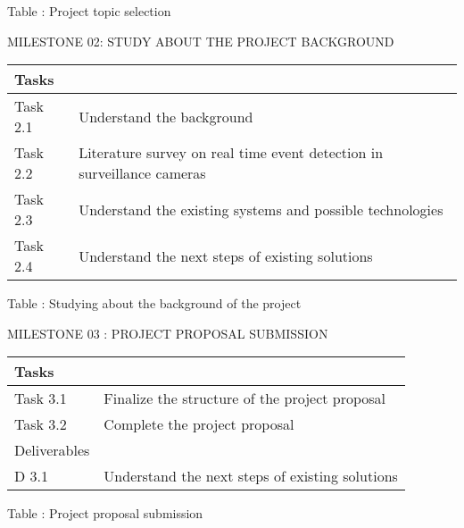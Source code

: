 \documentclass[
]{article}
\begin{document}
Table : Project topic selection

MILESTONE 02: STUDY ABOUT THE PROJECT BACKGROUND

\begin{longtable}[]{@{}ll@{}}
\toprule
Tasks &\tabularnewline
\midrule
\endhead
Task 2.1 & Understand the background\tabularnewline
Task 2.2 & Literature survey on real time event detection in
surveillance cameras\tabularnewline
Task 2.3 & Understand the existing systems and possible
technologies\tabularnewline
Task 2.4 & Understand the next steps of existing
solutions\tabularnewline
\bottomrule
\end{longtable}

Table : Studying about the background of the project

MILESTONE 03 : PROJECT PROPOSAL SUBMISSION

\begin{longtable}[]{@{}ll@{}}
\toprule
Tasks &\tabularnewline
\midrule
\endhead
Task 3.1 & Finalize the structure of the project proposal\tabularnewline
Task 3.2 & Complete the project proposal\tabularnewline
Deliverables &\tabularnewline
D 3.1 & Understand the next steps of existing solutions\tabularnewline
\bottomrule
\end{longtable}

Table : Project proposal submission
\end{document}
